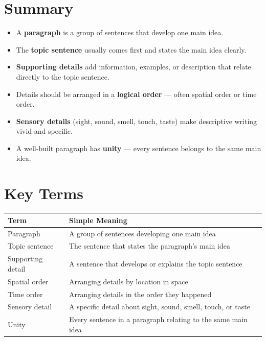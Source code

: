 \section{Summary}
\begin{summarybox}
\begin{itemize}
    \item A \textbf{paragraph} is a group of sentences that develop one main idea.
    \item The \textbf{topic sentence} usually comes first and states the main idea clearly.
    \item \textbf{Supporting details} add information, examples, or description that relate directly to the topic sentence.
    \item Details should be arranged in a \textbf{logical order} — often spatial order or time order.
    \item \textbf{Sensory details} (sight, sound, smell, touch, taste) make descriptive writing vivid and specific.
    \item A well-built paragraph has \textbf{unity} — every sentence belongs to the same main idea.
\end{itemize}
\end{summarybox}

\section{Key Terms}
\begin{table}[h!]
\centering
\begin{tabular}{|l|l|}
\hline
\textbf{Term} & \textbf{Simple Meaning} \\
\hline
Paragraph & A group of sentences developing one main idea \\
Topic sentence & The sentence that states the paragraph's main idea \\
Supporting detail & A sentence that develops or explains the topic sentence \\
Spatial order & Arranging details by location in space \\
Time order & Arranging details in the order they happened \\
Sensory detail & A specific detail about sight, sound, smell, touch, or taste \\
Unity & Every sentence in a paragraph relating to the same main idea \\
\hline
\end{tabular}
\end{table}

